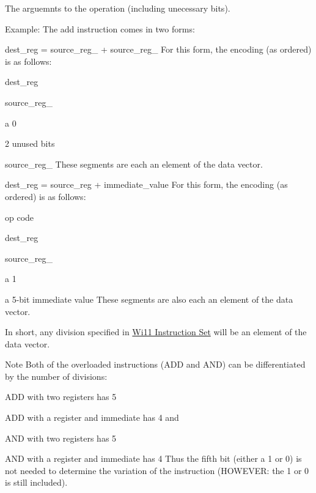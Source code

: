 The arguemnts to the operation (including unecessary bits). 

\begin{DoxyParagraph}{Example:}
The add instruction comes in two forms: 
\end{DoxyParagraph}
\begin{DoxyParagraph}{}
\begin{DoxyItemize}
\item dest\_\-reg = source\_\-reg\_ + source\_\-reg\_ For this form, the encoding (as ordered) is as follows: 
\begin{DoxyItemize}
\item dest\_\-reg 
\item source\_\-reg\_ 
\item a 0 
\item 2 unused bits 
\item source\_\-reg\_ These segments are each an element of the data vector. 
\end{DoxyItemize}\end{DoxyItemize}

\end{DoxyParagraph}
\begin{DoxyParagraph}{}
\begin{DoxyItemize}
\item dest\_\-reg = source\_\-reg + immediate\_\-value For this form, the encoding (as ordered) is as follows: 
\begin{DoxyItemize}
\item op code 
\item dest\_\-reg 
\item source\_\-reg\_ 
\item a 1 
\item a 5-\/bit immediate value These segments are also each an element of the data vector. 
\end{DoxyItemize}In short, any division specified in \hyperlink{index_instructions}{Wi11 Instruction Set} will be an element of the data vector.\end{DoxyItemize}

\end{DoxyParagraph}
\begin{DoxyNote}{Note}
Both of the overloaded instructions (ADD and AND) can be differentiated by the number of divisions: \begin{DoxyItemize}
\item ADD with two registers has 5 \item ADD with a register and immediate has 4 and \item AND with two registers has 5 \item AND with a register and immediate has 4 Thus the fifth bit (either a 1 or 0) is not needed to determine the variation of the instruction (HOWEVER: the 1 or 0 is still included). \end{DoxyItemize}

\end{DoxyNote}
